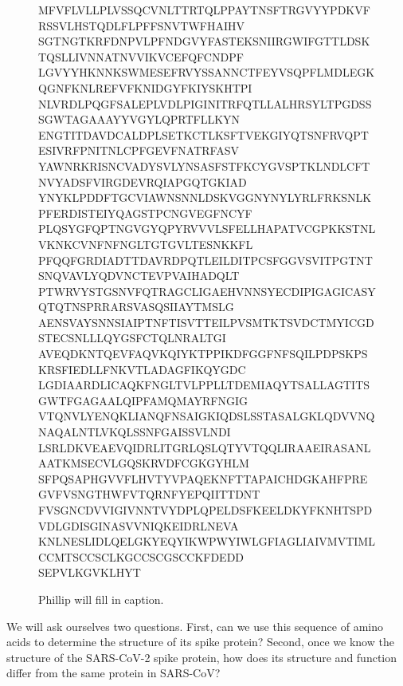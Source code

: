 \begin{figure}[h]
\begin{ttsequence}[1]MFVFLVLLPLVSSQCVNLTTRTQLPPAYTNSFTRGVYYPDKVFRSSVLHSTQDLFLPFFSNVTWFHAIHV\\
SGTNGTKRFDNPVLPFNDGVYFASTEKSNIIRGWIFGTTLDSKTQSLLIVNNATNVVIKVCEFQFCNDPF\\
LGVYYHKNNKSWMESEFRVYSSANNCTFEYVSQPFLMDLEGKQGNFKNLREFVFKNIDGYFKIYSKHTPI\\
NLVRDLPQGFSALEPLVDLPIGINITRFQTLLALHRSYLTPGDSSSGWTAGAAAYYVGYLQPRTFLLKYN\\
ENGTITDAVDCALDPLSETKCTLKSFTVEKGIYQTSNFRVQPTESIVRFPNITNLCPFGEVFNATRFASV\\
YAWNRKRISNCVADYSVLYNSASFSTFKCYGVSPTKLNDLCFTNVYADSFVIRGDEVRQIAPGQTGKIAD\\
YNYKLPDDFTGCVIAWNSNNLDSKVGGNYNYLYRLFRKSNLKPFERDISTEIYQAGSTPCNGVEGFNCYF\\
PLQSYGFQPTNGVGYQPYRVVVLSFELLHAPATVCGPKKSTNLVKNKCVNFNFNGLTGTGVLTESNKKFL\\
PFQQFGRDIADTTDAVRDPQTLEILDITPCSFGGVSVITPGTNTSNQVAVLYQDVNCTEVPVAIHADQLT\\
PTWRVYSTGSNVFQTRAGCLIGAEHVNNSYECDIPIGAGICASYQTQTNSPRRARSVASQSIIAYTMSLG\\
AENSVAYSNNSIAIPTNFTISVTTEILPVSMTKTSVDCTMYICGDSTECSNLLLQYGSFCTQLNRALTGI\\
AVEQDKNTQEVFAQVKQIYKTPPIKDFGGFNFSQILPDPSKPSKRSFIEDLLFNKVTLADAGFIKQYGDC\\
LGDIAARDLICAQKFNGLTVLPPLLTDEMIAQYTSALLAGTITSGWTFGAGAALQIPFAMQMAYRFNGIG\\
VTQNVLYENQKLIANQFNSAIGKIQDSLSSTASALGKLQDVVNQNAQALNTLVKQLSSNFGAISSVLNDI\\
LSRLDKVEAEVQIDRLITGRLQSLQTYVTQQLIRAAEIRASANLAATKMSECVLGQSKRVDFCGKGYHLM\\
SFPQSAPHGVVFLHVTYVPAQEKNFTTAPAICHDGKAHFPREGVFVSNGTHWFVTQRNFYEPQIITTDNT\\
FVSGNCDVVIGIVNNTVYDPLQPELDSFKEELDKYFKNHTSPDVDLGDISGINASVVNIQKEIDRLNEVA\\
KNLNESLIDLQELGKYEQYIKWPWYIWLGFIAGLIAIVMVTIMLCCMTSCCSCLKGCCSCGSCCKFDEDD\\
SEPVLKGVKLHYT\phantom{QCVNLTTRTQLPPAYTNSFTRGVYYPDKVFRSSVLHSTQDLFLPFFSNVTWFHAIHV}
\end{ttsequence}
\caption{Phillip will fill in caption.}
\label{fig:spike_protein_sequence}
\end{figure}

We will ask ourselves two questions. First, can we use this sequence of amino acids to determine the structure of its spike protein? Second, once we know the structure of the SARS-CoV-2 spike protein, how does its structure and function differ from the same protein in SARS-CoV?

